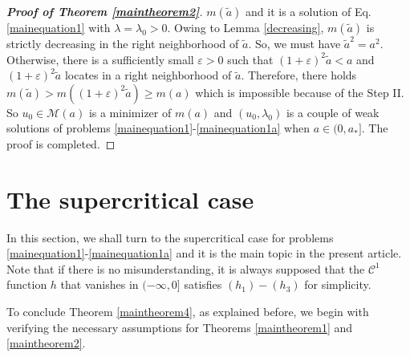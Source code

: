 \documentclass[11pt]{amsart}
\numberwithin{equation}{section}
\theoremstyle{definition}
\begin{document}
\begin{proof}[\emph{\textbf{Proof of Theorem \ref{maintheorem2}}}]
$m(\tilde{a})$ and it is a solution of Eq. \eqref{mainequation1} with $\lambda=\lambda_0>0$.
Owing to Lemma \ref{decreasing}, $m(\tilde{a})$ is strictly decreasing in the right neighborhood of $\tilde{a}$.
So, we must have $\tilde{a}^2=a^2$. Otherwise, there is a sufficiently small
$\varepsilon>0$ such that $(1+\varepsilon)^2\tilde{a}<a$ and $(1+\varepsilon)^2\tilde{a}$ locates
in a right neighborhood of $\tilde{a}$. Therefore, there holds
$m(\tilde{a})>m((1+\varepsilon)^2\tilde{a})\geq m(a)$ which is impossible because of the Step II. So
$u_0\in \mathcal{M}(a)$ is a minimizer of
$m(a)$ and $(u_0,\lambda_0)$ is a couple of weak solutions of problems \eqref{mainequation1}-\eqref{mainequation1a} when $a\in(0,a_*]$.
The proof is completed.
\end{proof}

 \section{The supercritical case}\label{Section5}


In this section, we shall turn to the supercritical case for problems \eqref{mainequation1}-\eqref{mainequation1a}
and it is the main topic in the present article. Note that if there is no misunderstanding,
it is always supposed that the $\mathcal{C}^1$ function $h$ that vanishes in $(-\infty,0]$ satisfies $(h_1)-(h_3)$
for simplicity.

To conclude Theorem \ref{maintheorem4},
as explained before, we begin with verifying the necessary assumptions for
Theorems \ref{maintheorem1} and \ref{maintheorem2}.
\end{document}
